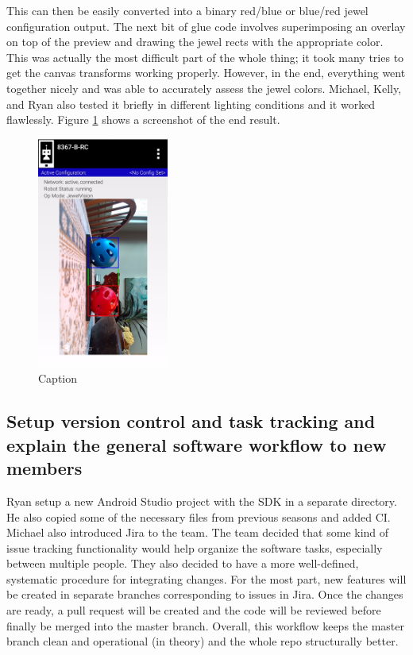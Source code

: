 \documentclass{article}
\begin{document}
This can then be easily converted into a binary red/blue or blue/red jewel configuration output. The next bit of glue code involves superimposing an overlay on top of the preview and drawing the jewel rects with the appropriate color. This was actually the most difficult part of the whole thing; it took many tries to get the canvas transforms working properly. However, in the end, everything went together nicely and was able to accurately assess the jewel colors. Michael, Kelly, and Ryan also tested it briefly in different lighting conditions and it worked flawlessly. Figure \ref{fig:vision} shows a screenshot of the end result.
\begin{figure}[h]
    \centering
    \includegraphics[width=.6\textwidth,height=3in,keepaspectratio]{02/images/jewelvision.PNG}
    \caption{Caption}
    \label{fig:vision}
\end{figure}

\subsection{Setup version control and task tracking and explain the general software workflow to new members}
Ryan setup a new Android Studio project with the SDK in a separate directory. He also copied some of the necessary files from previous seasons and added CI. Michael also introduced Jira to the team. The team decided that some kind of issue tracking functionality would help organize the software tasks, especially between multiple people. They also decided to have a more well-defined, systematic procedure for integrating changes. For the most part, new features will be created in separate branches corresponding to issues in Jira. Once the changes are ready, a pull request will be created and the code will be reviewed before finally be merged into the master branch. Overall, this workflow keeps the master branch clean and operational (in theory) and the whole repo structurally better. 
\end{document}
